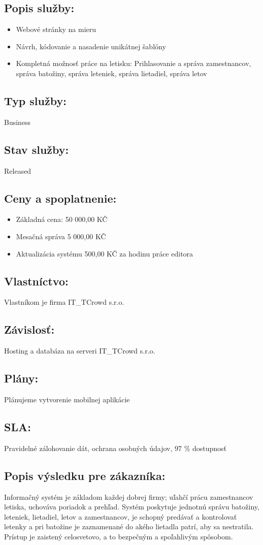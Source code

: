 \documentclass[a4paper, 11pt]{article}
\begin{document}
\subsection*{Popis služby:}
\begin{itemize}
\item Webové stránky na mieru
\item Návrh, kódovanie a nasadenie unikátnej šablóny
\item Kompletná možnosť práce na letisku: Prihlasovanie a správa zamestnancov, správa batožiny, správa leteniek, správa lietadiel, správa letov
\end{itemize}
\subsection*{Typ služby:}
Business
\subsection*{Stav služby:}
Released
\subsection*{Ceny a spoplatnenie:}
\begin{itemize}
\item Základná cena: 50 000,00 KČ
\item Mesačná správa 5 000,00 KČ
\item Aktualizácia systému 500,00 KČ za hodinu práce editora
\end{itemize}
\subsection*{Vlastníctvo:}
Vlastníkom je firma IT\_TCrowd s.r.o.
\subsection*{Závislosť:}
Hosting a databáza na serveri IT\_TCrowd s.r.o.
\subsection*{Plány:}
Plánujeme vytvorenie mobilnej aplikácie
\subsection*{SLA:}
Pravidelné zálohovanie dát, ochrana osobných údajov, 97 \% dostupnosť
\subsection*{Popis výsledku pre zákazníka:}
Informačný systém je základom každej dobrej firmy; uľahčí prácu zamestnancov letiska, uchováva poriadok a prehľad. Systém poskytuje jednotnú správu batožiny, leteniek, lietadiel, letov a zamestnancov, je schopný predávať a kontrolovať letenky a pri batožine je zaznamenané do akého lietadla patrí, aby sa nestratila. Prístup je zaistený celosvetovo, a to bezpečným a spoľahlivým spôsobom.
\end{document}
